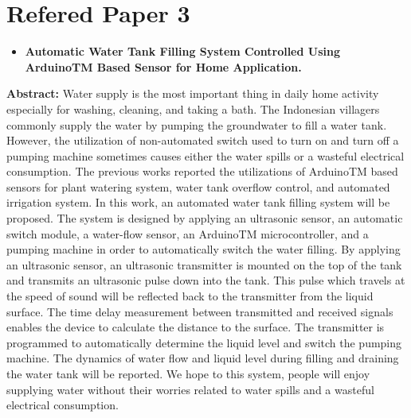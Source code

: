 \newpage
\section{Refered Paper 3}
 \begin{itemize}
 	\item  \Large\textbf {	Automatic Water Tank Filling System Controlled Using ArduinoTM Based Sensor for Home Application.}
 \end{itemize}
 { \Large \textbf{Abstract:}}
 Water supply is the most important thing in daily home activity especially for washing, cleaning, and taking a bath. The Indonesian villagers commonly supply the water by pumping the groundwater to fill a water tank. However, the utilization of non-automated switch used to turn on and turn off a pumping machine sometimes causes either the water spills or a wasteful electrical consumption. The previous works reported the utilizations of ArduinoTM based sensors for plant watering system, water tank overflow control, and automated irrigation system. In this work, an automated water tank filling system will be proposed. The system is designed by applying an ultrasonic sensor, an automatic switch module, a water-flow sensor, an ArduinoTM microcontroller, and a pumping machine in order to automatically switch the water filling. By applying an ultrasonic sensor, an ultrasonic transmitter is mounted on the top of the tank and transmits an ultrasonic pulse down into the tank. This pulse which travels at the speed of sound will be reflected back to the transmitter from the liquid surface. The time delay measurement between transmitted and received signals enables the device to calculate the distance to the surface. The transmitter is programmed to automatically determine the liquid level and switch the pumping machine. The dynamics of water flow and liquid level during filling and draining the water tank will be reported. We hope to this system, people will enjoy supplying water without their worries related to water spills and a wasteful electrical consumption.


